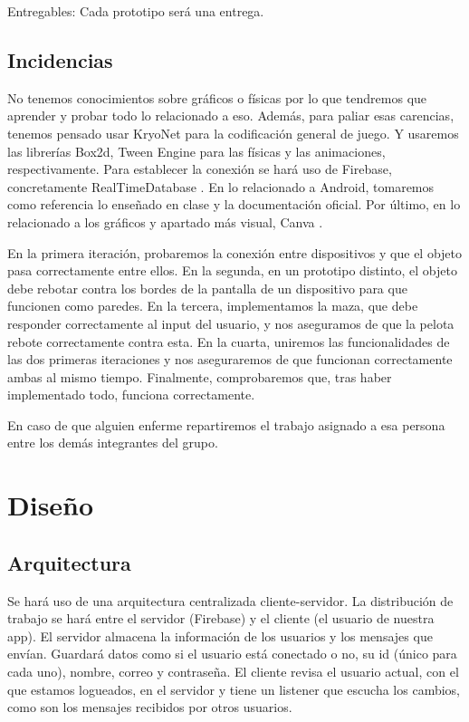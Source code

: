 \documentclass[a4paper,openright,12pt]{article}
\begin{document}
Entregables:
Cada prototipo será una entrega.

\subsection{Incidencias}
No tenemos conocimientos sobre gráficos o físicas por lo que tendremos que aprender y probar todo lo relacionado a eso. Además, para paliar esas carencias, tenemos pensado usar KryoNet\cite{misc-kryonet} para la codificación general de juego. Y usaremos las librerías Box2d\cite{misc-box2d}, Tween Engine\cite{misc-tween} para las físicas y las animaciones, respectivamente. Para establecer la conexión se hará uso de Firebase, concretamente RealTimeDatabase \cite{misc-firebase}. En lo relacionado a Android, tomaremos como referencia lo enseñado en clase y la documentación oficial\cite{misc-android-developers}. Por último, en lo relacionado a los gráficos y apartado más visual, Canva \cite{misc-canva}.
\par
En la primera iteración, probaremos la conexión entre dispositivos y que el objeto pasa correctamente entre ellos.
En la segunda, en un prototipo distinto, el objeto debe rebotar contra los bordes de la pantalla de un dispositivo para que funcionen como paredes.
En la tercera, implementamos la maza, que debe responder correctamente al input del usuario, y nos aseguramos de que la pelota rebote correctamente contra esta.
En la cuarta, uniremos las funcionalidades de las dos primeras iteraciones y nos aseguraremos de que funcionan correctamente ambas al mismo tiempo. Finalmente, comprobaremos que, tras haber implementado todo, funciona correctamente.
\par
En caso de que alguien enferme repartiremos el trabajo asignado a esa persona entre los demás integrantes del grupo.

\section{Diseño}
\subsection{Arquitectura}
Se hará uso de una arquitectura centralizada cliente-servidor. La distribución de trabajo se hará entre el servidor (Firebase) y el cliente (el usuario de nuestra app). El servidor almacena la información de los usuarios y los mensajes que envían. Guardará datos como si el usuario está conectado o no, su id (único para cada uno), nombre, correo y contraseña. El cliente revisa el usuario actual, con el que estamos logueados, en el servidor y tiene un listener que escucha los cambios, como son los mensajes recibidos por otros usuarios.
\end{document}

